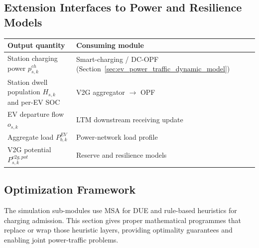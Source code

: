\subsection{Extension Interfaces to Power and Resilience Models}
\label{sec:traffic-extension}

\begin{center}
\begin{tabularx}{\textwidth}{L{0.32\textwidth}X}
\toprule
\textbf{Output quantity} & \textbf{Consuming module} \\
\midrule
Station charging power $p^{ch}_{s,k}$
  & Smart-charging / DC-OPF
    (Section~\ref{sec:ev_power_traffic_dynamic_model}) \\
Station dwell population $H_{s,k}$ and per-EV SOC
  & V2G aggregator $\to$ OPF \\
EV departure flow $o_{s,k}$
  & LTM downstream receiving update \\
Aggregate load $P^{EV}_{b,k}$
  & Power-network load profile \\
V2G potential $P^{v2g,pot}_{s,k}$
  & Reserve and resilience models \\
\bottomrule
\end{tabularx}
\end{center}

\subsection{Optimization Framework}
\label{sec:traffic-opt}

The simulation sub-modules use MSA for DUE and rule-based heuristics for
charging admission.  This section gives proper mathematical programmes that
replace or wrap those heuristic layers, providing optimality guarantees and
enabling joint power-traffic problems.

